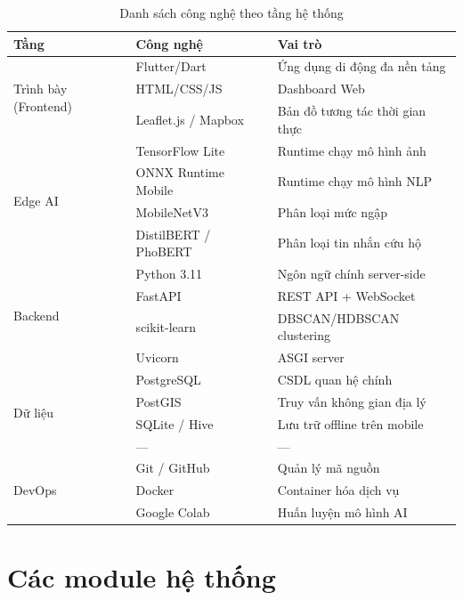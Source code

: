 \documentclass[12pt, a4paper]{report}
\begin{document}
\begin{table}[H]
\centering
\caption{Danh sách công nghệ theo tầng hệ thống}
\label{tab:tech-stack}
\begin{tabular}{llp{5.5cm}}
\toprule
\textbf{Tầng} & \textbf{Công nghệ} & \textbf{Vai trò} \\
\midrule
\multirow{3}{*}{Trình bày (Frontend)}
  & Flutter/Dart & Ứng dụng di động đa nền tảng \\
  & HTML/CSS/JS & Dashboard Web \\
  & Leaflet.js / Mapbox & Bản đồ tương tác thời gian thực \\
\midrule
\multirow{4}{*}{Edge AI}
  & TensorFlow Lite & Runtime chạy mô hình ảnh \\
  & ONNX Runtime Mobile & Runtime chạy mô hình NLP \\
  & MobileNetV3 & Phân loại mức ngập \\
  & DistilBERT / PhoBERT & Phân loại tin nhắn cứu hộ \\
\midrule
\multirow{4}{*}{Backend}
  & Python 3.11 & Ngôn ngữ chính server-side \\
  & FastAPI & REST API + WebSocket \\
  & scikit-learn & DBSCAN/HDBSCAN clustering \\
  & Uvicorn & ASGI server \\
\midrule
\multirow{4}{*}{Dữ liệu}
  & PostgreSQL & CSDL quan hệ chính \\
  & PostGIS & Truy vấn không gian địa lý \\
  & SQLite / Hive & Lưu trữ offline trên mobile \\
  & — & — \\
\midrule
\multirow{3}{*}{DevOps}
  & Git / GitHub & Quản lý mã nguồn \\
  & Docker & Container hóa dịch vụ \\
  & Google Colab & Huấn luyện mô hình AI \\
\bottomrule
\end{tabular}
\end{table}

\chapter{Các module hệ thống}
\end{document}
